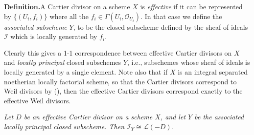 {\par\smallskip\noindent\textbf{Definition.}\enspace A Cartier divisor on a scheme $X$ is \emph{effective} if it can be represented by $\{(U_i,f_i)\}$ where all the $f_i\in\Gamma(U_i,\mathcal O_{U_i})$. In that case we define the \emph{associated subscheme} $Y$, to be the closed subscheme defined by the sheaf of ideals $\mathcal I$ which is locally generated by $f_i$.\EditionText{}

 Clearly this gives a 1-1 correspondence between effective Cartier divisors on $X$ and \emph{locally principal} closed subschemes $Y$, i.e., subschemes whose sheaf of ideals is locally generated by a single element\EditionText{}. Note also that if $X$ is an integral separated noetherian locally factorial scheme, so that the Cartier divisors correspond to Weil divisors by (), then the effective Cartier divisors correspond exactly to the effective Weil divisors.

 \emph{Let $D$ be an effective Cartier divisor on a scheme $X$, and let $Y$ be the associated locally principal closed subscheme. Then $\mathcal I_Y\cong\mathcal L(-D)$.}
}
